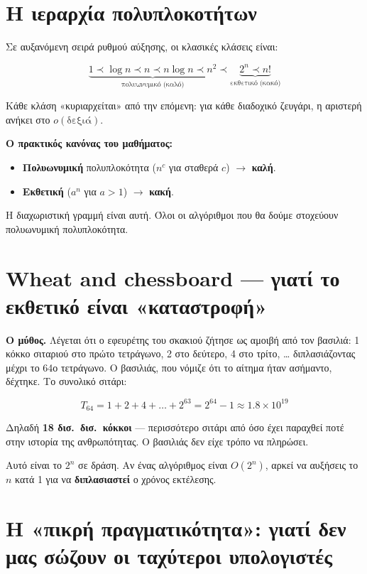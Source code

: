 \documentclass[11pt,a4paper]{article}
\begin{document}
\section{Η ιεραρχία πολυπλοκοτήτων}

Σε αυξανόμενη σειρά ρυθμού αύξησης, οι κλασικές κλάσεις είναι:

\[
\underbrace{1 \prec \log n \prec n \prec n \log n \prec n^2}_{\text{πολυωνυμικό (καλό)}}
\prec
\underbrace{2^n \prec n!}_{\text{εκθετικό (κακό)}}
\]

Κάθε κλάση «κυριαρχείται» από την επόμενη: για κάθε διαδοχικό ζευγάρι, η αριστερή
ανήκει στο $o(\text{δεξιά})$.

\begin{keypoint}
\textbf{Ο πρακτικός κανόνας του μαθήματος:}
\begin{itemize}
  \item \textbf{Πολυωνυμική} πολυπλοκότητα ($n^c$ για σταθερά $c$) $\to$
  \textbf{καλή}.
  \item \textbf{Εκθετική} ($a^n$ για $a > 1$) $\to$ \textbf{κακή}.
\end{itemize}
Η διαχωριστική γραμμή είναι αυτή. Όλοι οι αλγόριθμοι που θα δούμε στοχεύουν
πολυωνυμική πολυπλοκότητα.
\end{keypoint}

\section{Wheat and chessboard --- γιατί το εκθετικό είναι «καταστροφή»}

\begin{examplebox}
\textbf{Ο μύθος.} Λέγεται ότι ο εφευρέτης του σκακιού ζήτησε ως αμοιβή από τον
βασιλιά: 1 κόκκο σιταριού στο πρώτο τετράγωνο, 2 στο δεύτερο, 4 στο τρίτο, \dots
διπλασιάζοντας μέχρι το 64ο τετράγωνο. Ο βασιλιάς, που νόμιζε ότι το αίτημα ήταν
ασήμαντο, δέχτηκε. Το συνολικό σιτάρι:

\[
T_{64} = 1 + 2 + 4 + \dots + 2^{63} = 2^{64} - 1 \approx 1.8 \times 10^{19}
\]

Δηλαδή \textbf{18 δισ.\ δισ.\ κόκκοι} --- περισσότερο σιτάρι από όσο έχει
παραχθεί ποτέ στην ιστορία της ανθρωπότητας. Ο βασιλιάς δεν είχε τρόπο να
πληρώσει.
\end{examplebox}

Αυτό είναι το $2^n$ σε δράση. Αν ένας αλγόριθμος είναι $O(2^n)$, αρκεί να αυξήσεις
το $n$ κατά 1 για να \textbf{διπλασιαστεί} ο χρόνος εκτέλεσης.

\section{Η «πικρή πραγματικότητα»: γιατί δεν μας σώζουν οι ταχύτεροι υπολογιστές}
\end{document}
